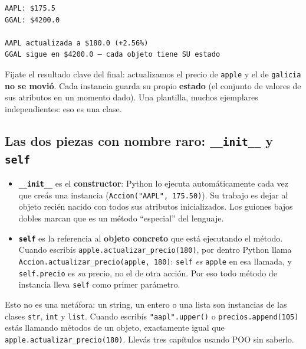 \documentclass[
  spanish,
  letterpaper,
  DIV=11,
  numbers=noendperiod]{scrreprt}
\providecommand{\tightlist}{%
  \setlength{\itemsep}{0pt}\setlength{\parskip}{0pt}}
\begin{document}
\begin{verbatim}
AAPL: $175.5
GGAL: $4200.0

AAPL actualizada a $180.0 (+2.56%)
GGAL sigue en $4200.0 — cada objeto tiene SU estado
\end{verbatim}

Fijate el resultado clave del final: actualizamos el precio de
\texttt{apple} y el de \texttt{galicia} \textbf{no se movió}. Cada
instancia guarda su propio \textbf{estado} (el conjunto de valores de
sus atributos en un momento dado). Una plantilla, muchos ejemplares
independientes: eso es una clase.

\subsection{\texorpdfstring{Las dos piezas con nombre raro:
\texttt{\_\_init\_\_} y
\texttt{self}}{Las dos piezas con nombre raro: \_\_init\_\_ y self}}\label{las-dos-piezas-con-nombre-raro-__init__-y-self}

\begin{itemize}
\tightlist
\item
  \textbf{\texttt{\_\_init\_\_}} es el \textbf{constructor}: Python lo
  ejecuta automáticamente cada vez que creás una instancia
  (\texttt{Accion("AAPL",\ 175.50)}). Su trabajo es dejar al objeto
  recién nacido con todos sus atributos inicializados. Los guiones bajos
  dobles marcan que es un método ``especial'' del lenguaje.
\item
  \textbf{\texttt{self}} es la referencia al \textbf{objeto concreto}
  que está ejecutando el método. Cuando escribís
  \texttt{apple.actualizar\_precio(180)}, por dentro Python llama
  \texttt{Accion.actualizar\_precio(apple,\ 180)}: \texttt{self}
  \emph{es} \texttt{apple} en esa llamada, y \texttt{self.precio} es
  \emph{su} precio, no el de otra acción. Por eso todo método de
  instancia lleva \texttt{self} como primer parámetro.
\end{itemize}

\begin{tcolorbox}[enhanced jigsaw, bottomrule=.15mm, colback=white, opacitybacktitle=0.6, arc=.35mm, toprule=.15mm, opacityback=0, breakable, titlerule=0mm, left=2mm, coltitle=black, colbacktitle=quarto-callout-note-color!10!white, colframe=quarto-callout-note-color-frame, leftrule=.75mm, toptitle=1mm, bottomtitle=1mm, title=\textcolor{quarto-callout-note-color}{\faInfo}\hspace{0.5em}{En Python, todo es un objeto}, rightrule=.15mm]

Esto no es una metáfora: un string, un entero o una lista son instancias
de las clases \texttt{str}, \texttt{int} y \texttt{list}. Cuando
escribís \texttt{"aapl".upper()} o \texttt{precios.append(105)} estás
llamando métodos de un objeto, exactamente igual que
\texttt{apple.actualizar\_precio(180)}. Llevás tres capítulos usando POO
sin saberlo.

\end{tcolorbox}
\end{document}
